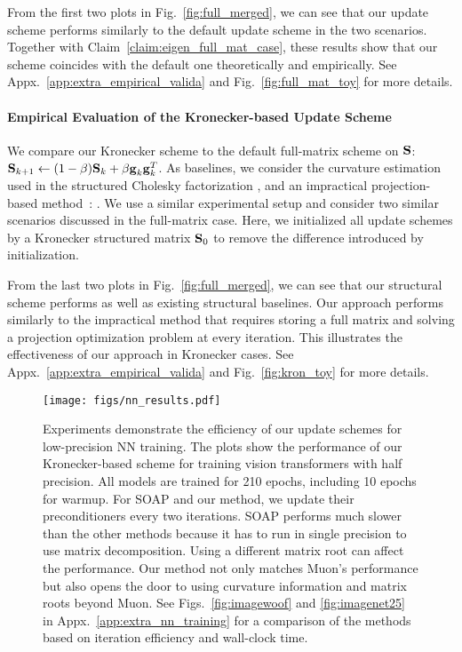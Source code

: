 \vspace{-0.4cm}
From the first two plots in  Fig.~\ref{fig:full_merged}, we can see that our update scheme performs similarly to the default update scheme in the two scenarios. Together with Claim~\ref{claim:eigen_full_mat_case}, these results show that our scheme
coincides with the default one theoretically and empirically.
%
See Appx.~\ref{app:extra_empirical_valida} and Fig.~\ref{fig:full_mat_toy} for more details.


\vspace{-0.2cm}
\paragraph{Empirical Evaluation of the Kronecker-based Update Scheme}
We compare our Kronecker scheme to the default full-matrix scheme on $\mbox{$\mbox{$\mathbf{S}$}$}$: 
$ \mbox{$\mbox{$\mathbf{S}$}$}_{k+1} \leftarrow (1-\beta)  \mbox{$\mbox{$\mathbf{S}$}$}_{k} + \beta \mbox{$\mbox{$\mathbf{g}$}$}_k\mbox{$\mbox{$\mathbf{g}$}$}_k^T$. %
As baselines, we consider the curvature estimation used in the structured Cholesky factorization \citep{lincan2024}, and an impractical projection-based method~\citep{van1993approximation}: .
We use a similar experimental setup and consider two similar scenarios
discussed in the full-matrix case.
Here, we initialized all update schemes by a Kronecker structured matrix $\mbox{$\mbox{$\mathbf{S}$}$}_0$ to remove the difference introduced by initialization.

From the last two plots in  Fig.~\ref{fig:full_merged}, we can see that our structural scheme performs as well as existing structural baselines. Our approach performs similarly to the impractical method that requires storing a full matrix and solving a projection optimization problem at every iteration. This illustrates the effectiveness of our approach in Kronecker cases.
See Appx.~\ref{app:extra_empirical_valida} and Fig.~\ref{fig:kron_toy} for more details.

\begin{figure*}
  \centering
  \texttt{[image: figs/nn\_results.pdf]}
  \vspace{-5ex}
  \caption{
  Experiments demonstrate the efficiency of our update schemes for low-precision NN training. 
  The plots show the performance of our Kronecker-based scheme for training vision transformers with half precision. 
  All models are trained for 210 epochs, including 10 epochs for warmup.
  For SOAP and our method, we update
  their preconditioners every two iterations.
  SOAP performs much slower than the other methods because it has to run in single precision to use matrix decomposition. 
  Using a different matrix root can affect the performance.
  Our method not only matches Muon's performance but also
  opens the door to using curvature information and matrix roots beyond Muon.
  See  Figs.~\ref{fig:imagewoof} and \ref{fig:imagenet25} in Appx.~\ref{app:extra_nn_training} for a comparison of the methods based on iteration efficiency and wall-clock time. 
 \vspace{-0.4cm} 
  }
  \label{fig:results}
\end{figure*}


